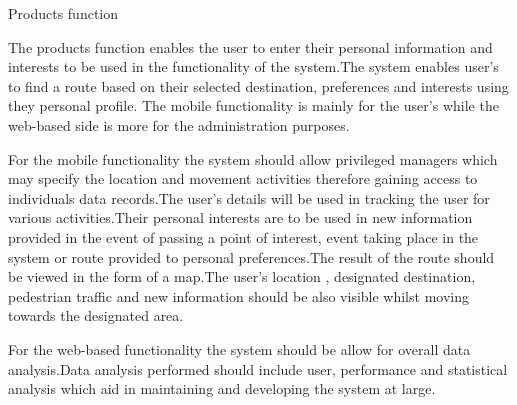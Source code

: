 Products function
\par
\bigskip
\noindent
The products function enables the user to enter their personal information and interests to be used in the functionality of the system.The system enables user's to find a route based on their selected destination, preferences and interests using they personal profile.
The mobile functionality is mainly for the user's while the web-based side is more for the administration purposes.
\par
\bigskip
\noindent
For the mobile functionality the system should allow privileged managers which may specify the location and movement activities therefore gaining access to individuals data records.The user's details will be used in tracking the user for various activities.Their personal interests are to be used in new information provided in the event of passing a point of interest, event taking place in the system or route provided to personal preferences.The result of the route should be viewed in the form of a map.The user's location , designated destination,  pedestrian traffic and new information should be also visible whilst moving towards the designated area.
\par
\bigskip
\noindent
For the web-based functionality the system should be allow for overall data analysis.Data analysis performed should include user, performance and statistical analysis which aid in maintaining and developing the system at large.
